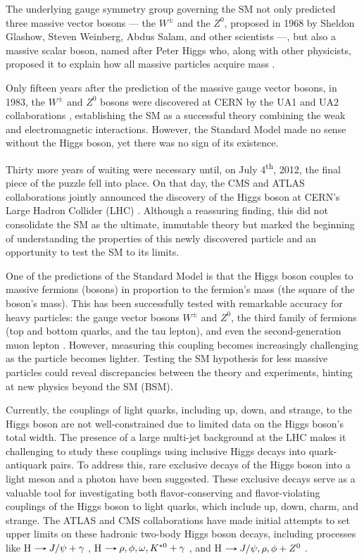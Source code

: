 The underlying gauge symmetry group governing the SM not only predicted three massive vector bosons --- the $W^\pm$ and the $Z^0$, proposed in 1968 by Sheldon Glashow, Steven Weinberg, Abdus Salam, and other scientists \cite{Glashow:1961tr, Salam:1964ry, Weinberg:1967tq} ---, but also a massive scalar boson, named after Peter Higgs who, along with other physicists, proposed it to explain how all massive particles acquire mass \cite{Higgs:1964pj, Englert:1964et, Guralnik:1964eu}.

Only fifteen years after the prediction of the massive gauge vector bosons, in 1983, the $W^\pm$ and $Z^0$ bosons were discovered at CERN by the UA1 and UA2 collaborations \cite{UA1:1983crd, UA2:1983tsx}, establishing the SM as a successful theory combining the weak and electromagnetic interactions. However, the Standard Model made no sense without the Higgs boson, yet there was no sign of its existence.

Thirty more years of waiting were necessary until, on July 4\textsuperscript{th}, 2012, the final piece of the puzzle fell into place. On that day, the CMS and ATLAS collaborations jointly announced the discovery of the Higgs boson at CERN's Large Hadron Collider (LHC) \cite{CMS:2012qbp, ATLAS:2012yve}. Although a reassuring finding, this did not consolidate the SM as the ultimate, immutable theory but marked the beginning of understanding the properties of this newly discovered particle and an opportunity to test the SM to its limits.

One of the predictions of the Standard Model is that the Higgs boson couples to massive fermions (bosons) in proportion to the fermion's mass (the square of the boson's mass). This has been successfully tested with remarkable accuracy for heavy particles: the gauge vector bosons $W^\pm$ and $Z^0$, the third family of fermions (top and bottom quarks, and the tau lepton), and even the second-generation muon lepton \cite{CMS:2022dwd}. However, measuring this coupling becomes increasingly challenging as the particle becomes lighter. Testing the SM hypothesis for less massive particles could reveal discrepancies between the theory and experiments, hinting at new physics beyond the SM (BSM).

Currently, the couplings of light quarks, including up, down, and strange, to the Higgs boson are not well-constrained due to limited data on the Higgs boson's total width. The presence of a large multi-jet background at the LHC makes it challenging to study these couplings using inclusive Higgs decays into quark-antiquark pairs. To address this, rare exclusive decays of the Higgs boson into a light meson and a photon have been suggested. These exclusive decays serve as a valuable tool for investigating both flavor-conserving and flavor-violating couplings of the Higgs boson to light quarks, which include up, down, charm, and strange. The ATLAS and CMS collaborations have made initial attempts to set upper limits on these hadronic two-body Higgs boson decays, including processes like H$\decaysto J/\psi + \gamma$ \cite{ATLAS:2022rej, CMS:2018gcm}, H$\decaysto \rho,\phi,\omega,K^{*0} + \gamma$ \cite{ATLAS:2017gko, ATLAS:2023alf}, and H$\decaysto J/\psi,\rho,\phi + Z^0$ \cite{CMS:2022fsq, CMS:2020ggo}.

